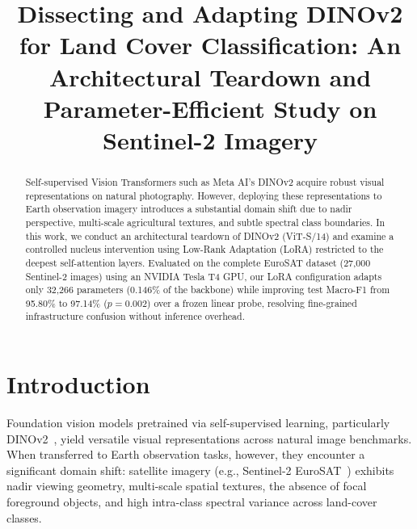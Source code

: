 \documentclass[conference,a4paper]{IEEEtran}
\begin{document}
\title{Dissecting and Adapting DINOv2 for Land Cover Classification: An Architectural Teardown and Parameter-Efficient Study on Sentinel-2 Imagery}

\author{
}

\maketitle

\begin{abstract}
Self-supervised Vision Transformers such as Meta AI's DINOv2 acquire robust visual representations on natural photography. However, deploying these representations to Earth observation imagery introduces a substantial domain shift due to nadir perspective, multi-scale agricultural textures, and subtle spectral class boundaries. In this work, we conduct an architectural teardown of DINOv2 (ViT-S/14) and examine a controlled nucleus intervention using Low-Rank Adaptation (LoRA) restricted to the deepest self-attention layers. Evaluated on the complete EuroSAT dataset (27,000 Sentinel-2 images) using an NVIDIA Tesla T4 GPU, our LoRA configuration adapts only 32,266 parameters (0.146\% of the backbone) while improving test Macro-F1 from 95.80\% to 97.14\% ($p = 0.002$) over a frozen linear probe, resolving fine-grained infrastructure confusion without inference overhead.
\end{abstract}

\section{Introduction}
Foundation vision models pretrained via self-supervised learning, particularly DINOv2~\cite{oquab2023dinov2}, yield versatile visual representations across natural image benchmarks. When transferred to Earth observation tasks, however, they encounter a significant domain shift: satellite imagery (e.g., Sentinel-2 EuroSAT~\cite{helber2019eurosat}) exhibits nadir viewing geometry, multi-scale spatial textures, the absence of focal foreground objects, and high intra-class spectral variance across land-cover classes. 
\end{document}
